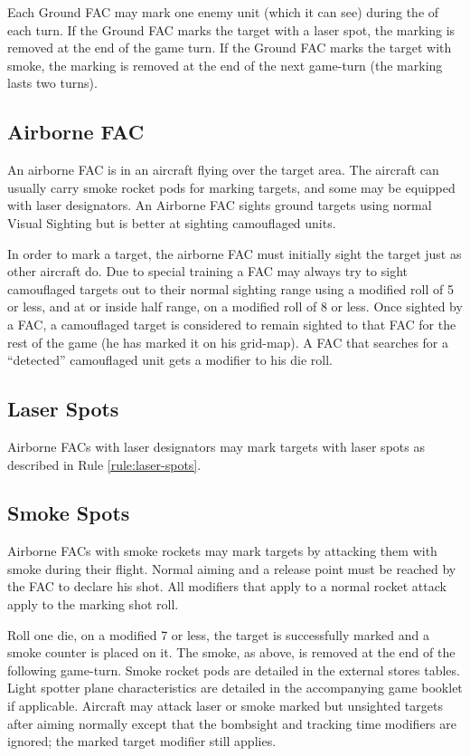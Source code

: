 \begin{advancedrules}
    Each Ground FAC may mark one enemy unit (which it can see) during the  of each turn. If the Ground FAC marks the target with a laser spot, the marking is removed at the end of the game turn. If the Ground FAC marks the target with smoke, the marking is removed at the end of the next game-turn (the marking lasts two turns).

    \subsection{Airborne FAC} An airborne FAC is in an aircraft flying over the target area. The aircraft can usually carry smoke rocket pods for marking targets, and some may be equipped with laser designators. An Airborne FAC sights ground targets using normal Visual Sighting but is better at sighting camouflaged units.

    In order to mark a target, the airborne FAC must initially sight the target just as other aircraft do. Due to special training a FAC may always try to sight camouflaged targets out to their normal sighting range using a modified roll of 5 or less, and at or inside half range, on a modified roll of 8 or less. Once sighted by a FAC, a camouflaged target is considered to remain sighted to that FAC for the rest of the game (he has marked it on his grid-map). A FAC that searches for a “detected” camouflaged unit gets a  modifier to his die roll.

    \subsection{Laser Spots} Airborne FACs with laser designators may mark targets with laser spots as described in Rule \ref{rule:laser-spots}.

    \subsection{Smoke Spots} Airborne FACs with smoke rockets may mark targets by attacking them with smoke during their flight. Normal aiming and a release point must be reached by the FAC to declare his shot. All modifiers that apply to a normal rocket attack apply to the marking shot roll.

    Roll one die, on a modified 7 or less, the target is successfully marked and a smoke counter is placed on it. The smoke, as above, is removed at the end of the following game-turn. Smoke rocket pods are detailed in the external stores tables. Light spotter plane characteristics are detailed in the accompanying game booklet if applicable. Aircraft may attack laser or smoke marked but unsighted targets after aiming normally except that the bombsight and tracking time modifiers are ignored; the marked target modifier still applies.


\end{advancedrules}
